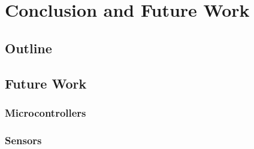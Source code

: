 \chapter{Conclusion and Future Work}
\label{chp:results}



\section{Outline}


\section{Future Work}

\subsection{Microcontrollers}

\subsection{Sensors}

